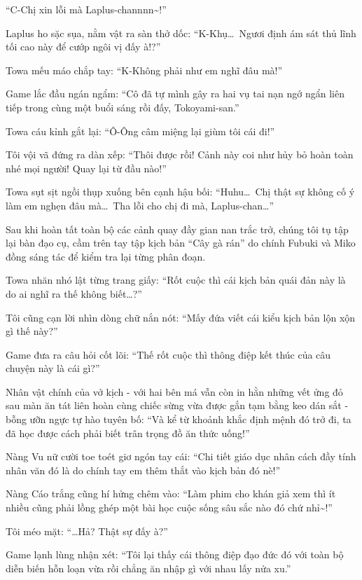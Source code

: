 \documentclass[../main.tex]{subfiles}
\begin{document}
``C-Chị xin lỗi mà Laplus-channnn\~{}!''

Laplus ho sặc sụa, nằm vật ra sàn thở dốc: ``K-Khụ\dots\ Ngươi định ám sát thủ lĩnh tối cao này để cướp ngôi vị đấy à!?''

Towa mếu máo chắp tay: ``K-Không phải như em nghĩ đâu mà!''

Game lắc đầu ngán ngẩm: ``Cô đã tự mình gây ra hai vụ tai nạn ngớ ngẩn liên tiếp trong cùng một buổi sáng rồi đấy, Tokoyami-san.''

Towa cáu kỉnh gắt lại: ``Ô-Ông câm miệng lại giùm tôi cái đi!''

Tôi vội vã đứng ra dàn xếp: ``Thôi được rồi! Cảnh này coi như hủy bỏ hoàn toàn nhé mọi người! Quay lại từ đầu nào!''

Towa sụt sịt ngồi thụp xuống bên cạnh hậu bối: ``Huhu\dots\ Chị thật sự không cố ý làm em nghẹn đâu mà\dots\ Tha lỗi cho chị đi mà, Laplus-chan\dots''

\il

Sau khi hoàn tất toàn bộ các cảnh quay đầy gian nan trắc trở, chúng tôi tụ tập lại bàn đạo cụ, cầm trên tay tập kịch bản ``Cây gà rán'' do chính Fubuki và Miko đồng sáng tác để kiểm tra lại từng phân đoạn.

Towa nhăn nhó lật từng trang giấy: ``Rốt cuộc thì cái kịch bản quái đản này là do ai nghĩ ra thế không biết\dots?''


Tôi cũng cạn lời nhìn dòng chữ nắn nót: ``Mấy đứa viết cái kiểu kịch bản lộn xộn gì thế này?''

Game đưa ra câu hỏi cốt lõi: ``Thế rốt cuộc thì thông điệp kết thúc của câu chuyện này là cái gì?''

Nhân vật chính của vở kịch - với hai bên má vẫn còn in hằn những vết ửng đỏ sau màn ăn tát liên hoàn cùng chiếc sừng vừa được gắn tạm bằng keo dán sắt - bỗng ưỡn ngực tự hào tuyên bố: ``Và kể từ khoảnh khắc định mệnh đó trở đi, ta đã học được cách phải biết trân trọng đồ ăn thức uống!''

Nàng Vu nữ cười toe toét giơ ngón tay cái: ``Chi tiết giáo dục nhân cách đầy tính nhân văn đó là do chính tay em thêm thắt vào kịch bản đó nè!''

Nàng Cáo trắng cũng hí hửng chêm vào: ``Làm phim cho khán giả xem thì ít nhiều cũng phải lồng ghép một bài học cuộc sống sâu sắc nào đó chứ nhỉ\~{}!''

Tôi méo mặt: ``\dots Hả? Thật sự đấy à?''

Game lạnh lùng nhận xét: ``Tôi lại thấy cái thông điệp đạo đức đó với toàn bộ diễn biến hỗn loạn vừa rồi chẳng ăn nhập gì với nhau lấy nửa xu.''
\end{document}
